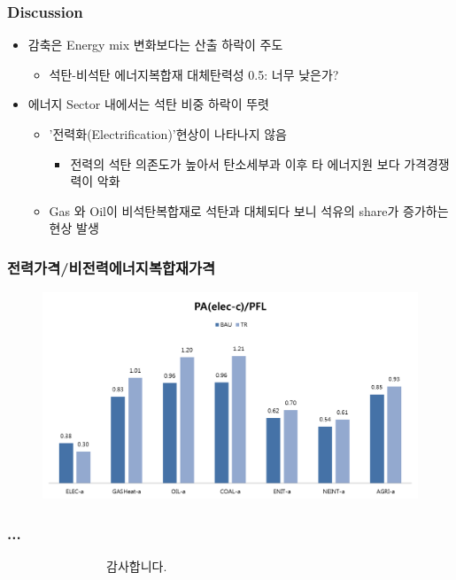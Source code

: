 \documentclass[10pt,compress,slidetop,%
			   hyperref={unicode},xcolor={svgnames},%
			   t]{beamer}
\begin{document}
\begin{frame}
	\frametitle{Discussion}
		\begin{itemize}
			\item{감축은 Energy mix 변화보다는 산출 하락이 주도}
			\begin{itemize}
				\item{석탄-비석탄 에너지복합재 대체탄력성 0.5: 너무 낮은가?}
			\end{itemize} 
			\bigskip
			\item{에너지 Sector 내에서는 석탄 비중 하락이 뚜렷 }
			\begin{itemize}
				\item{'전력화(Electrification)'현상이 나타나지 않음}
					\begin{itemize}
						\item{전력의 석탄 의존도가 높아서 탄소세부과 이후 타 에너지원 보다 가격경쟁력이 악화}
					\end{itemize} 
				\item{Gas 와 Oil이 비석탄복합재로 석탄과 대체되다 보니 석유의 share가 증가하는 현상 발생}
			\end{itemize} 	
			\end{itemize}
\end{frame}
\begin{frame}
	\frametitle{전력가격/비전력에너지복합재가격}
	\begin{figure}
		\centering
		\includegraphics[width=1.00\textwidth]{PelecPFL.png}
	\end{figure}
\end{frame}
\begin{frame}[fragile]
\frametitle{...}
\bigskip
\bigskip
\bigskip
\bigskip
\begin{Huge}
$\qquad$$\qquad$$\qquad$$\qquad$감사합니다.
\end{Huge}
\end{frame}
\end{document}
